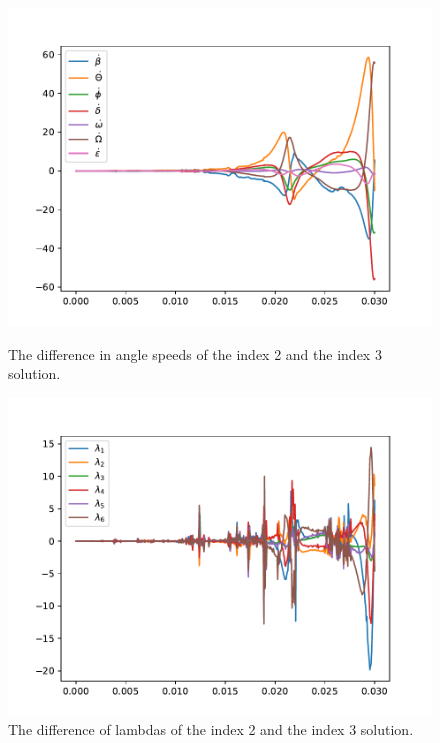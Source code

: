 \documentclass{report}
\begin{document}
\begin{figure}[h]
\centering
\begin{minipage}[t]{0.45\textwidth}
\centering
\includegraphics[width=\textwidth]{../Plots/Project2_main/Figure_541}
\caption{The difference in angle speeds of the index 2 and the index 3 solution.}
\label{pl:indx2_solndiff_anglesdot}
\end{minipage}
\hfill
\begin{minipage}[t]{0.45\textwidth}
\centering
\includegraphics[width=\textwidth]{../Plots/Project2_main/Figure_542}
\caption{The difference of lambdas of the index 2 and the index 3 solution.}
\label{pl:indx2_solndiff_lambdas}
\end{minipage}
\end{figure}
\end{document}
